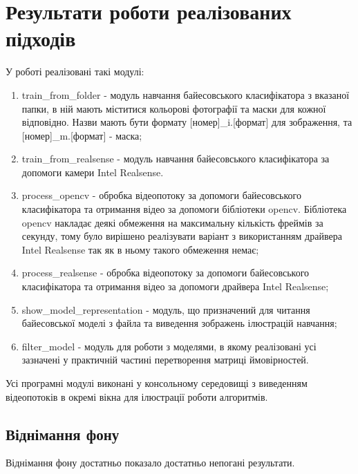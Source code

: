 \section{Результати роботи реалізованих підходів}
У роботі реалізовані такі модулі:
\begin{enumerate}
	\item train\_from\_folder - модуль навчання байесовського класифікатора з вказаної папки, в ній мають міститися кольорові фотографії та маски для кожної відповідно. Назви мають бути формату [номер]\_i.[формат] для зображення, та [номер]\_m.[формат] - маска;
	\item train\_from\_realsense - модуль навчання байесовського класифікатора за допомоги камери Intel Realsense.
	\item process\_opencv - обробка відеопотоку за допомоги байесовського класифікатора та отримання відео за допомоги бібліотеки opencv. Бібліотека opencv накладає деякі обмеження на максимальну кількість фреймів за секунду, тому було вирішено реалізувати варіант з використанням драйвера Intel Realsense так як в ньому такого обмеження немає;
	\item process\_realsense - обробка відеопотоку за допомоги байесовського класифікатора та отримання відео за допомоги драйвера Intel Realsense;
	\item show\_model\_representation - модуль, що призначений для читання байесовської моделі з файла та виведення зображень ілюстрацій навчання;
	\item filter\_model - модуль для роботи з моделями, в якому реалізовані усі зазначені у практичній частині перетворення матриці ймовірностей.
\end{enumerate}

Усі програмні модулі виконані у консольному середовищі з виведенням відеопотоків в окремі вікна для ілюстрації роботи алгоритмів.
\subsection{Віднімання фону}
Віднімання фону достатньо показало достатньо непогані результати.


